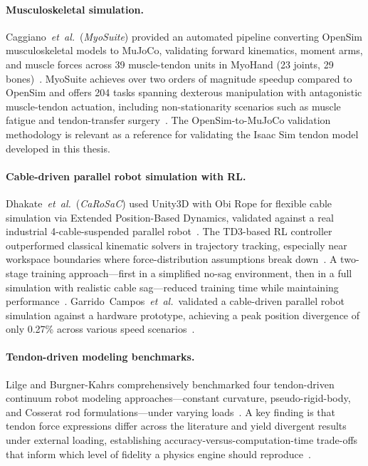 \paragraph{Musculoskeletal simulation.}
Caggiano~\emph{et~al.}\ (\emph{MyoSuite}) provided an automated pipeline
converting OpenSim musculoskeletal models to MuJoCo, validating forward
kinematics, moment arms, and muscle forces across 39 muscle-tendon units
in MyoHand (23 joints, 29 bones)~\cite{Caggiano2022MyoSuite}.
MyoSuite achieves over two orders of magnitude speedup compared to OpenSim
and offers 204 tasks spanning dexterous manipulation with antagonistic
muscle-tendon actuation, including non-stationarity scenarios such as
muscle fatigue and tendon-transfer surgery~\cite{Caggiano2022MyoSuite}.
The OpenSim-to-MuJoCo validation methodology is relevant as a reference
for validating the Isaac Sim tendon model developed in this thesis.

\paragraph{Cable-driven parallel robot simulation with RL.}
Dhakate~\emph{et~al.}\ (\emph{CaRoSaC}) used Unity3D with Obi Rope for
flexible cable simulation via Extended Position-Based Dynamics, validated
against a real industrial 4-cable-suspended parallel robot~\cite{Dhakate2025CaRoSaC}.
The TD3-based \ac{RL} controller outperformed classical kinematic solvers
in trajectory tracking, especially near workspace boundaries where
force-distribution assumptions break down~\cite{Dhakate2025CaRoSaC}.
A two-stage training approach---first in a simplified no-sag environment,
then in a full simulation with realistic cable sag---reduced training time
while maintaining performance~\cite{Dhakate2025CaRoSaC}.
Garrido~Campos~\emph{et~al.}\ validated a cable-driven parallel robot
simulation against a hardware prototype, achieving a peak position
divergence of only 0.27\% across various speed
scenarios~\cite{Garrido2024CDPR}.

\paragraph{Tendon-driven modeling benchmarks.}
Lilge and Burgner-Kahrs comprehensively benchmarked four tendon-driven
continuum robot modeling approaches---constant curvature, pseudo-rigid-body,
and Cosserat rod formulations---under varying loads~\cite{Lilge2021BenchmarkTDCR}.
A key finding is that tendon force expressions differ across the literature
and yield divergent results under external loading, establishing
accuracy-versus-computation-time trade-offs that inform which level of
fidelity a physics engine should reproduce~\cite{Lilge2021BenchmarkTDCR}.

